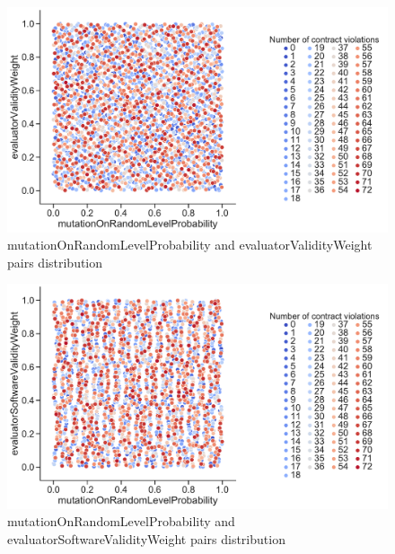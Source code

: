 \begin{figure}
	\centering
	\includegraphics[width=\textwidth]{images/PairsDistr/mutationOnRandomLevelProbability_evaluatorValidityWeight.pdf}
	\caption[mutationOnRandomLevelProbability and evaluatorValidityWeight pairs distribution]{mutationOnRandomLevelProbability and evaluatorValidityWeight pairs distribution}
	\label{fig:mutationOnRandomLevelProbability_evaluatorValidityWeight_pair}
\end{figure}
\begin{figure}
	\centering
	\includegraphics[width=\textwidth]{images/PairsDistr/mutationOnRandomLevelProbability_evaluatorSoftwareValidityWeight.pdf}
	\caption[mutationOnRandomLevelProbability and evaluatorSoftwareValidityWeight pairs distribution]{mutationOnRandomLevelProbability and evaluatorSoftwareValidityWeight pairs distribution}   
	\label{fig:mutationOnRandomLevelProbability_evaluatorSoftwareValidityWeight_pair}
\end{figure}
